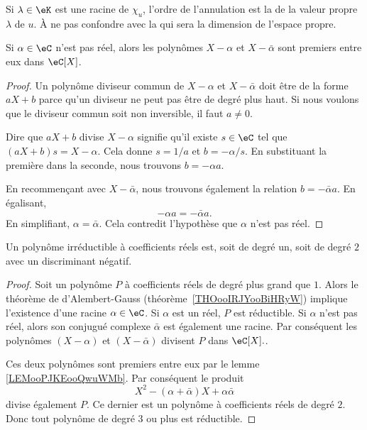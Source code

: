 \begin{definition}      \label{DEFooVFTYooJyDePn}
	Si \( \lambda\in\eK\) est une racine de \( \chi_u\), l'ordre de l'annulation est la  de la valeur propre \( \lambda\) de \( u\). À ne pas confondre avec la  qui sera la dimension de l'espace propre.
\end{definition}

\begin{lemma}       \label{LEMooPJKEooQwuWMb}
    Si \( \alpha\in \eC\) n'est pas réel, alors les polynômes \( X-\alpha\) et \( X-\bar\alpha\) sont premiers entre eux dans \( \eC[X]\).
\end{lemma}

\begin{proof}
    Un polynôme diviseur commun de \( X-\alpha\) et \( X-\bar \alpha\) doit être de la forme \( aX+b\) parce qu'un diviseur ne peut pas être de degré plus haut. Si nous voulons que le diviseur commun soit non inversible, il faut \( a\neq 0\).

    Dire que \( aX+b\) divise \( X-\alpha\) signifie qu'il existe \( s\in \eC\) tel que \( (aX+b)s=X-\alpha\). Cela donne \( s=1/a\) et \( b=-\alpha/s\). En substituant la première dans la seconde, nous trouvons \( b=-\alpha a\).

    En recommençant avec \( X-\bar\alpha\), nous trouvons également la relation \( b=-\bar \alpha a\). En égalisant,
    \begin{equation}
        -\alpha a=-\bar \alpha a.
    \end{equation}
    En simplifiant, \( \alpha=\bar \alpha\). Cela contredit l'hypothèse que \( \alpha\) n'est pas réel.
\end{proof}

\begin{proposition}     \label{PROPooUMDQooVmfDYU}
	Un polynôme irréductible à coefficients réels est, soit de degré un, soit de degré \( 2\) avec un discriminant négatif.
\end{proposition}

\begin{proof}
	Soit un polynôme \( P\) à coefficients réels de degré plus grand que \( 1\). Alors le théorème de d'Alembert-Gauss (théorème~\ref{THOooIRJYooBiHRyW}) implique l'existence d'une racine \( \alpha \in \eC \). Si \( \alpha\) est un réel, \( P\) est réductible. Si \( \alpha\) n'est pas réel, alors son conjugué complexe \( \bar \alpha\) est également une racine. Par conséquent les polynômes \( (X-\alpha)\) et \( (X-\bar \alpha)\) divisent \( P\) dans \( \eC[X]. \).

    Ces deux polynômes sont premiers entre eux par le lemme \ref{LEMooPJKEooQwuWMb}. Par conséquent le produit
	\begin{equation}
		X^2-(\alpha+\bar \alpha)X+\alpha\bar\alpha
	\end{equation}
	divise également \( P\). Ce dernier est un polynôme à coefficients réels de degré \( 2\). Donc tout polynôme de degré \( 3\) ou plus est réductible.
\end{proof}

